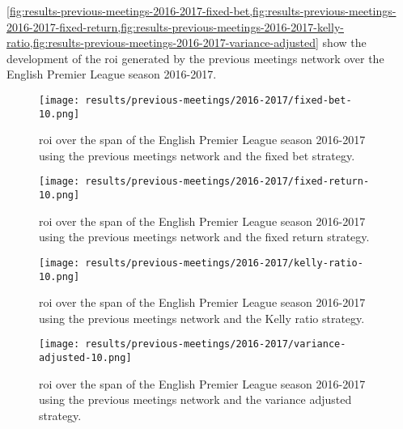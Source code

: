 \cref{fig:results-previous-meetings-2016-2017-fixed-bet,fig:results-previous-meetings-2016-2017-fixed-return,fig:results-previous-meetings-2016-2017-kelly-ratio,fig:results-previous-meetings-2016-2017-variance-adjusted} show the development of the \gls{roi} generated by the previous meetings network over the English Premier League season 2016-2017.
\begin{figure}
    \centering
    \texttt{[image: results/previous-meetings/2016-2017/fixed-bet-10.png]}
    \caption{\gls{roi} over the span of the English Premier League season 2016-2017 using the previous meetings network and the fixed bet strategy.}
    \label{fig:results-previous-meetings-2016-2017-fixed-bet}
\end{figure}
\begin{figure}
    \centering
    \texttt{[image: results/previous-meetings/2016-2017/fixed-return-10.png]}
    \caption{\gls{roi} over the span of the English Premier League season 2016-2017 using the previous meetings network and the fixed return strategy.}
    \label{fig:results-previous-meetings-2016-2017-fixed-return}
\end{figure}
\begin{figure}
    \centering
    \texttt{[image: results/previous-meetings/2016-2017/kelly-ratio-10.png]}
    \caption{\gls{roi} over the span of the English Premier League season 2016-2017 using the previous meetings network and the Kelly ratio strategy.}
    \label{fig:results-previous-meetings-2016-2017-kelly-ratio}
\end{figure}
\begin{figure}
    \centering
    \texttt{[image: results/previous-meetings/2016-2017/variance-adjusted-10.png]}
    \caption{\gls{roi} over the span of the English Premier League season 2016-2017 using the previous meetings network and the variance adjusted strategy.}
    \label{fig:results-previous-meetings-2016-2017-variance-adjusted}
\end{figure}

